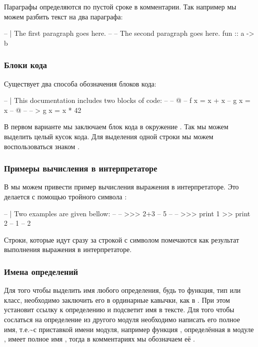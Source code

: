 Параграфы определяются по пустой сроке в комментарии. Так например мы
можем разбить текст на два параграфа:


\begin{code}
-- | The first paragraph goes here.
--
-- The second paragraph goes here.
fun :: a -> b
\end{code}

\subsubsection{Блоки кода}

Существует два способа обозначения блоков кода:


\begin{code}
-- | This documentation includes two blocks of code:
--
-- @
--     f x = x + x
--     g x = x
-- @
--
-- >  g x = x * 42
\end{code}

В первом варианте мы заключаем блок кода в окружение . Так мы
можем выделить целый кусок кода. Для выделения одной строки мы можем
воспользоваться знаком \In{>}.

\subsubsection{Примеры вычисления в интерпретаторе}

В  мы можем привести пример вычисления выражения в
интерпретаторе. Это делается с помощью тройного символа \In{>}:


\begin{code}
-- | Two examples are given bellow:
--
-- >>> 2+3
-- 5
--
-- >>> print 1 >> print 2
-- 1
-- 2
\end{code}

Строки, которые идут сразу за строкой с символом \In{>>>} помечаются как
результат выполнения выражения в интерпретаторе.

\subsubsection{Имена определений}

Для того чтобы выделить имя любого определения, будь то функция, тип или
класс, необходимо заключить его в ординарные кавычки, как в .
При этом  установит ссылку к определению и подсветит имя в
тексте. Для того чтобы сослаться на определение из другого модуля
необходимо написать его полное имя, т.е.\textasciitilde{}с приставкой
имени модуля, например функция , определённая в модуле ,
имеет полное имя , тогда в комментариях мы обозначаем её
.

